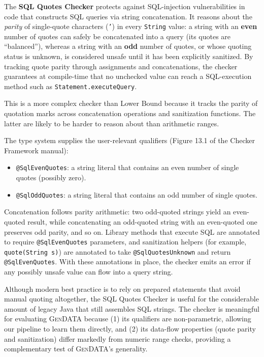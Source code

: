 \documentclass[acmsmall,screen,review,anonymous]{acmart}
\makeatletter
\newcommand{\gendata}{\textsc{GenDATA}\xspace}
\newcommand{\cf}{Checker Framework\xspace}
\newcommand{\atmark}[1]{\texttt{@#1}}
\makeatother
\begin{document}
The \textbf{SQL Quotes Checker} protects against SQL-injection vulnerabilities in code that constructs SQL queries via string concatenation. It reasons about the \emph{parity} of single-quote characters (\texttt{'}) in every \texttt{String} value: a string with an \textbf{even} number of quotes can safely be concatenated into a query (its quotes are ``balanced''), whereas a string with an \textbf{odd} number of quotes, or whose quoting status is unknown, is considered unsafe until it has been explicitly sanitized. By tracking quote parity through assignments and concatenations, the checker guarantees at compile-time that no unchecked value can reach a SQL-execution method such as \texttt{Statement.executeQuery}.

This is a more complex checker than Lower Bound because it tracks the parity of quotation marks across concatenation operations and sanitization functions. The latter are likely to be harder to reason about than arithmetic ranges.

The type system supplies the user-relevant qualifiers (Figure 13.1 of the \cf manual):

\begin{itemize}
    \item \atmark{SqlEvenQuotes}: a string literal that contains an even number of single quotes (possibly zero).
    \item \atmark{SqlOddQuotes}: a string literal that contains an odd number of single quotes.
\end{itemize}

Concatenation follows parity arithmetic: two odd-quoted strings yield an even-quoted result, while concatenating an odd-quoted string with an even-quoted one preserves odd parity, and so on. Library methods that execute SQL are annotated to require \atmark{SqlEvenQuotes} parameters, and sanitization helpers (for example, \texttt{quote(String s)}) are annotated to take \atmark{SqlQuotesUnknown} and return \atmark{SqlEvenQuotes}. With these annotations in place, the checker emits an error if any possibly unsafe value can flow into a query string.

Although modern best practice is to rely on prepared statements that avoid manual quoting altogether, the SQL Quotes Checker is useful for the considerable amount of legacy Java that still assembles SQL strings. The checker is meaningful for evaluating \gendata because (1) its qualifiers are non-parametric, allowing our pipeline to learn them directly, and (2) its data-flow properties (quote parity and sanitization) differ markedly from numeric range checks, providing a complementary test of \gendata's generality.
\end{document}
